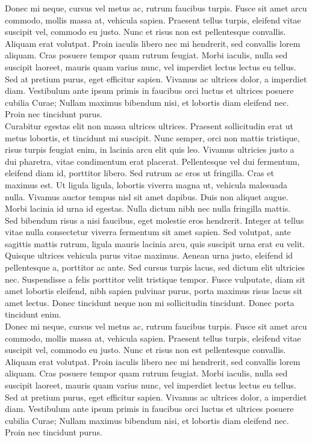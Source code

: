 Donec mi neque, cursus vel metus ac, rutrum faucibus turpis. Fusce sit amet arcu commodo, mollis massa at, vehicula sapien. Praesent tellus turpis, eleifend vitae suscipit vel, commodo eu justo. Nunc et risus non est pellentesque convallis. Aliquam erat volutpat. Proin iaculis libero nec mi hendrerit, sed convallis lorem aliquam. Cras posuere tempor quam rutrum feugiat. Morbi iaculis, nulla sed suscipit laoreet, mauris quam varius nunc, vel imperdiet lectus lectus eu tellus. Sed at pretium purus, eget efficitur sapien. Vivamus ac ultrices dolor, a imperdiet diam. Vestibulum ante ipsum primis in faucibus orci luctus et ultrices posuere cubilia Curae; Nullam maximus bibendum nisi, et lobortis diam eleifend nec. Proin nec tincidunt purus. 
\\

Curabitur egestas elit non massa ultrices ultrices. Praesent sollicitudin erat ut metus lobortis, et tincidunt mi suscipit. Nunc semper, orci non mattis tristique, risus turpis feugiat enim, in lacinia arcu elit quis leo. Vivamus ultricies justo a dui pharetra, vitae condimentum erat placerat. Pellentesque vel dui fermentum, eleifend diam id, porttitor libero. Sed rutrum ac eros ut fringilla. Cras et maximus est. Ut ligula ligula, lobortis viverra magna ut, vehicula malesuada nulla. Vivamus auctor tempus nisl sit amet dapibus. Duis non aliquet augue. Morbi lacinia id urna id egestas. Nulla dictum nibh nec nulla fringilla mattis.
\\

Sed bibendum risus a nisi faucibus, eget molestie eros hendrerit. Integer at tellus vitae nulla consectetur viverra fermentum sit amet sapien. Sed volutpat, ante sagittis mattis rutrum, ligula mauris lacinia arcu, quis suscipit urna erat eu velit. Quisque ultrices vehicula purus vitae maximus. Aenean urna justo, eleifend id pellentesque a, porttitor ac ante. Sed cursus turpis lacus, sed dictum elit ultricies nec. Suspendisse a felis porttitor velit tristique tempor. Fusce vulputate, diam sit amet lobortis eleifend, nibh sapien pulvinar purus, porta maximus risus lacus sit amet lectus. Donec tincidunt neque non mi sollicitudin tincidunt. Donec porta tincidunt enim.
\\

Donec mi neque, cursus vel metus ac, rutrum faucibus turpis. Fusce sit amet arcu commodo, mollis massa at, vehicula sapien. Praesent tellus turpis, eleifend vitae suscipit vel, commodo eu justo. Nunc et risus non est pellentesque convallis. Aliquam erat volutpat. Proin iaculis libero nec mi hendrerit, sed convallis lorem aliquam. Cras posuere tempor quam rutrum feugiat. Morbi iaculis, nulla sed suscipit laoreet, mauris quam varius nunc, vel imperdiet lectus lectus eu tellus. Sed at pretium purus, eget efficitur sapien. Vivamus ac ultrices dolor, a imperdiet diam. Vestibulum ante ipsum primis in faucibus orci luctus et ultrices posuere cubilia Curae; Nullam maximus bibendum nisi, et lobortis diam eleifend nec. Proin nec tincidunt purus. 
\\


